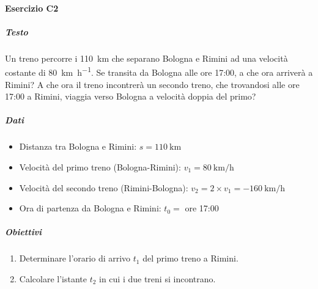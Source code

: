 \documentclass{article}
\begin{document}
\paragraph*{Esercizio C2}
\subparagraph*{Testo}
Un treno percorre i \SI{110}{\kilo\meter} che separano Bologna e Rimini ad una velocità costante di \SI{80}{\kilo\meter\per\hour}. Se transita da Bologna alle ore 17:00, a che ora arriverà a Rimini?
A che ora il treno incontrerà un secondo treno, che trovandosi alle ore 17:00 a Rimini, viaggia verso Bologna a velocità doppia del primo?
\subparagraph*{Dati}
\begin{itemize}
    \item Distanza tra Bologna e Rimini: \( s = \SI{110}{\kilo\meter} \)
    \item Velocità del primo treno (Bologna-Rimini): \( v_1 = \SI{80}{\kilo\meter\per\hour} \)
    \item Velocità del secondo treno (Rimini-Bologna): \( v_2 = 2 \times v_1 = - \SI{160}{\kilo\meter\per\hour} \)
    \item Ora di partenza da Bologna e Rimini: \( t_0 = \) ore 17:00
\end{itemize}

\subparagraph*{Obiettivi}
\begin{enumerate}[label=\alph*)]
    \item Determinare l'orario di arrivo \( t_1 \) del primo treno a Rimini.
    \item Calcolare l'istante \( t_2 \) in cui i due treni si incontrano.
\end{enumerate}
\end{document}
